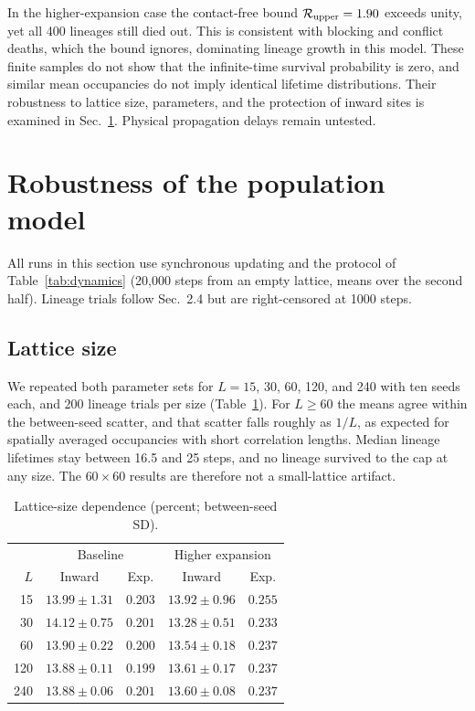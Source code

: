 \documentclass[10pt,twocolumn]{article}
\begin{document}
In the higher-expansion case the contact-free bound
$\mathcal R_{\rm upper}=1.90$ exceeds unity, yet all 400 lineages
still died out. This is consistent with blocking and conflict deaths,
which the bound ignores, dominating lineage growth in this model. These finite samples do not
show that the infinite-time survival probability is zero, and similar
mean occupancies do not imply identical lifetime distributions.
Their robustness to lattice size, parameters, and the protection of
inward sites is examined in Sec.~\ref{sec:robustness}. Physical
propagation delays remain untested.

\section{Robustness of the population model}\label{sec:robustness}
All runs in this section use synchronous updating and the protocol of
Table~\ref{tab:dynamics} (20,000 steps from an empty lattice, means
over the second half). Lineage trials follow
Sec.~2.4 but are right-censored at 1000 steps.

\subsection{Lattice size}
We repeated both parameter sets for $L=15$, 30, 60, 120, and 240 with
ten seeds each, and 200 lineage trials per size
(Table~\ref{tab:size}). For $L\ge60$ the means agree within the
between-seed scatter, and that scatter falls roughly as $1/L$, as
expected for spatially averaged occupancies with short correlation
lengths. Median lineage lifetimes stay between 16.5 and 25 steps, and
no lineage survived to the cap at any size. The $60\times60$ results are
therefore not a small-lattice artifact.

\begin{table}[ht]
\centering
\caption{Lattice-size dependence (percent; between-seed SD).}
\setlength{\tabcolsep}{3pt}
\begin{tabular}{rcccc}
\toprule
& \multicolumn{2}{c}{Baseline} & \multicolumn{2}{c}{Higher expansion}\\
$L$ & Inward & Exp. & Inward & Exp.\\
\midrule
15 & $13.99\pm1.31$ & $0.203$ & $13.92\pm0.96$ & $0.255$\\
30 & $14.12\pm0.75$ & $0.201$ & $13.28\pm0.51$ & $0.233$\\
60 & $13.90\pm0.22$ & $0.200$ & $13.54\pm0.18$ & $0.237$\\
120 & $13.88\pm0.11$ & $0.199$ & $13.61\pm0.17$ & $0.237$\\
240 & $13.88\pm0.06$ & $0.201$ & $13.60\pm0.08$ & $0.237$\\
\bottomrule
\end{tabular}
\label{tab:size}
\end{table}
\end{document}
